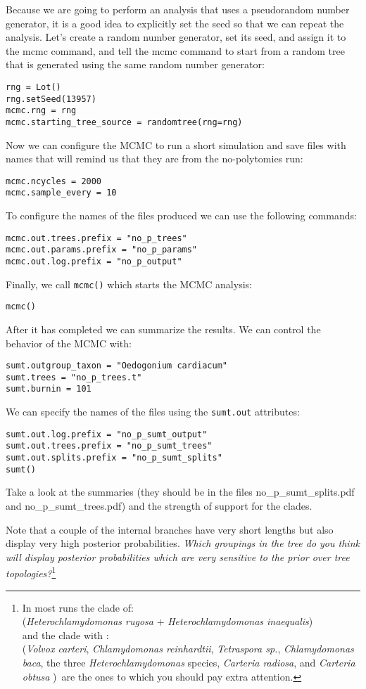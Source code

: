 \documentclass{article}
\newcommand{\cmd}[1]{\texttt{#1}\xspace}
\newcommand{\localfile}[1]{\textsf{#1}\xspace}
\newcommand{\QandA}[2]{\textit{#1}\footnote{#2}\xspace}
\begin{document}
Because we are going to perform an analysis that uses a pseudorandom number generator, it is a 
good idea to explicitly set the seed so that we can repeat the analysis.
Let's create a random number generator, set its seed, and assign it to the mcmc command, and 
tell the mcmc command to start from a random tree that is generated using the same random
number generator:

\begin{verbatim}
rng = Lot()
rng.setSeed(13957)
mcmc.rng = rng
mcmc.starting_tree_source = randomtree(rng=rng)
\end{verbatim}

Now we can configure the MCMC to run a short simulation and save files with names that
will remind us that they are from the no-polytomies run:
\begin{verbatim}
mcmc.ncycles = 2000
mcmc.sample_every = 10
\end{verbatim}

To configure the names of the files produced we can use the following commands:
\begin{verbatim}
mcmc.out.trees.prefix = "no_p_trees"
mcmc.out.params.prefix = "no_p_params"
mcmc.out.log.prefix = "no_p_output"
\end{verbatim}

Finally, we call \cmd{mcmc()} which starts the MCMC analysis:
\begin{verbatim}
mcmc()
\end{verbatim}

After it has completed we can summarize the results.
We can control the behavior of the MCMC with:
\begin{verbatim}
sumt.outgroup_taxon = "Oedogonium cardiacum"
sumt.trees = "no_p_trees.t"
sumt.burnin = 101
\end{verbatim}

We can specify the names of the files using the \cmd{sumt.out} attributes:
\begin{verbatim}
sumt.out.log.prefix = "no_p_sumt_output"
sumt.out.trees.prefix = "no_p_sumt_trees"
sumt.out.splits.prefix = "no_p_sumt_splits"
sumt()
\end{verbatim}
Take a look at the summaries (they should be in the files \localfile{no\_p\_sumt\_splits.pdf} and \localfile{no\_p\_sumt\_trees.pdf}) and  the strength of support for the clades.

Note that a couple of the internal branches have very short lengths but 
also display very high posterior probabilities.  
\QandA{Which groupings in the tree do you think will display posterior probabilities
which are very sensitive to the prior over tree topologies?}{In most runs the clade of:\\ ({\em Heterochlamydomonas rugosa} + {\em Heterochlamydomonas inaequalis})\\ 
and the clade with :\\ 
({\em Volvox carteri},
{\em Chlamydomonas reinhardtii},
{\em Tetraspora sp.},
{\em Chlamydomonas baca},
the three {\em Heterochlamydomonas} species,
{\em Carteria radiosa}, and {\em Carteria obtusa }
)\
are the ones to which you should pay extra attention.}
\end{document}
